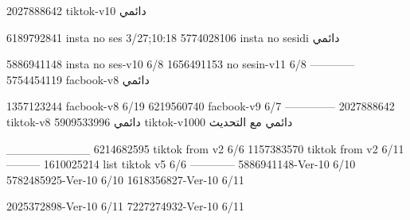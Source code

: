 2027888642 tiktok-v10
دائمي

6189792841 insta no ses
3/27;10:18
5774028106 insta no sesidi
دائمي

5886941148 insta no ses-v10
6/8
1656491153 no sesin-v11
6/8
------------
5754454119 facbook-v8
دائمي

1357123244 facbook-v8
6/19
6219560740 facbook-v9
6/7
--------------
2027888642 tiktok-v8
دائمي
5909533996 tiktok-v1000
دائمي مع التحديث

__________
6214682595 tiktok from v2
6/6
1157383570 tiktok from v2
6/11
---------
1610025214 list tiktok v5
6/6
------------
5886941148-Ver-10
6/10
5782485925-Ver-10
6/10
1618356827-Ver-10
6/11

2025372898-Ver-10
6/11
7227274932-Ver-10
6/11
